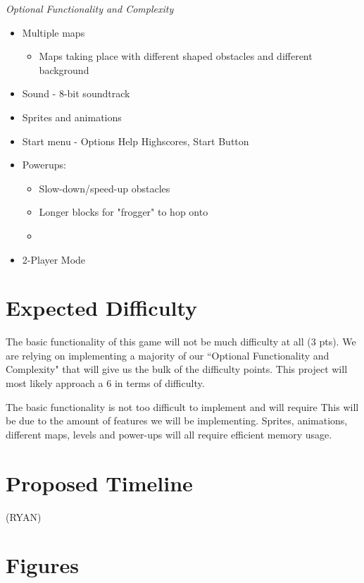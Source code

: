 \documentclass[journal, twocolumn, final,11pt,letterpaper]{IEEEtran}
\begin{document}
\vspace{5mm}

\textit{Optional Functionality and Complexity}
\begin{itemize}
	\item Multiple maps
	\begin{itemize}
		\item Maps taking place with different shaped obstacles and different background
	\end{itemize}
	\item Sound - 8-bit soundtrack
	\item Sprites and animations
	\item Start menu - Options Help Highscores, Start Button
	\item Powerups:
		\begin{itemize}
			\item Slow-down/speed-up obstacles
			\item Longer blocks for "frogger" to hop onto
			\item 
		\end{itemize}
	\item 2-Player Mode
\end{itemize}

\section{Expected Difficulty}
The basic functionality of this game will not be much difficulty at all (3 pts). We are relying on implementing a majority of our ``Optional Functionality and Complexity" that will give us the bulk of the difficulty points. This project will most likely approach a 6 in terms of difficulty. 

The basic functionality is not too difficult to implement and will require  This will be due to the amount of features we will be implementing. Sprites, animations, different maps, levels and power-ups will all require efficient memory usage. 

\section{Proposed Timeline} (RYAN)


\onecolumn
\section{Figures}
\end{document}
